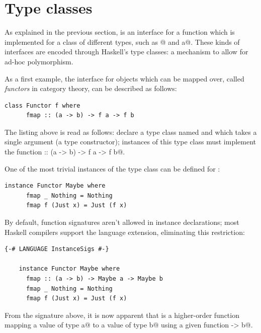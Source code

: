 \documentclass[UdineBachThesis,american,11pt]{PhdThesis}
\begin{document}
  \section{Type classes}

  As explained in the previous section, \lstinline@foldr@ is an interface for a
  function which is implemented for a class of different types, such as
  \lstinline@[a]@ and \lstinline@Maybe a@. These kinds of interfaces are encoded
  through Haskell's type classes: a mechanism to allow for ad-hoc polymorphism.

  As a first example, the interface for objects which can be mapped over, called
  \emph{functors} in category theory, can be described as follows:

  \begin{lstlisting}[gobble=4,basicstyle=\ttfamily\small]
    class Functor f where
      fmap :: (a -> b) -> f a -> f b
  \end{lstlisting}

  The listing above is read as follows: declare a type class named
  \lstinline@Functor@ and which takes a single argument \lstinline@f@ (a type
  constructor); instances of this type class must implement the function
  \lstinline@fmap :: (a -> b) -> f a -> f b@.

  One of the most trivial instances of the \lstinline@Functor@ type class can be
  defined for \lstinline@Maybe@:

  \pagebreak

  \begin{lstlisting}[gobble=4,basicstyle=\ttfamily\small]
    instance Functor Maybe where
      fmap _ Nothing = Nothing
      fmap f (Just x) = Just (f x)
  \end{lstlisting}

  By default, function signatures aren't allowed in instance declarations; most
  Haskell compilers support the \lstinline@InstanceSigs@ language extension,
  eliminating this restriction:

  \begin{lstlisting}[gobble=4,basicstyle=\ttfamily\small]
    {-# LANGUAGE InstanceSigs #-}

    instance Functor Maybe where
      fmap :: (a -> b) -> Maybe a -> Maybe b
      fmap _ Nothing = Nothing
      fmap f (Just x) = Just (f x)
  \end{lstlisting}

  From the signature above, it is now apparent that \lstinline@fmap@ is a
  higher-order function mapping a value of type \lstinline@Maybe a@ to a value
  of type \lstinline@Maybe b@ using a given function \lstinline@a -> b@.
\end{document}
